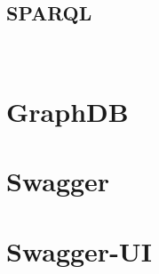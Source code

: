 \subsection{SPARQL}
~\cite{lsparql}


\section{GraphDB}

\section{Swagger}

\section{Swagger-UI}







